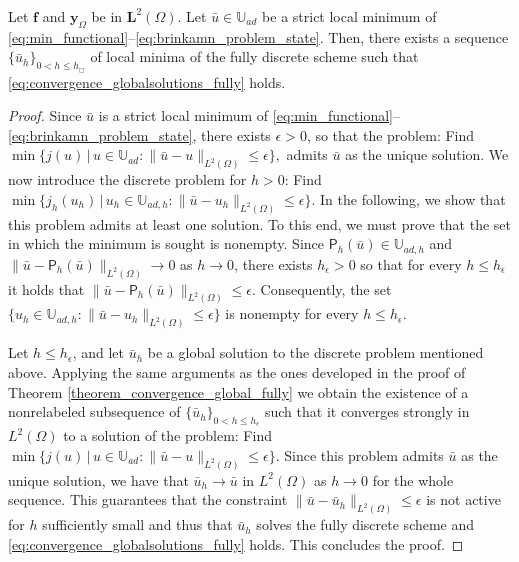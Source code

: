 \documentclass[final]{siamart0216}
\begin{document}
\begin{theorem}
Let $\mathbf{f}$ and $\mathbf{y}_{\Omega}$ be in $\mathbf{L}^2(\Omega)$. Let $\bar{u} \in \mathbb{U}_{ad}$ be a strict local minimum of \eqref{eq:min_functional}--\eqref{eq:brinkamn_problem_state}. Then, there exists a sequence $\{\bar{u}_{h}\}_{0 < h \leq h_{\Box}}$ of local minima of the fully discrete scheme such that \eqref{eq:convergence_globalsolutions_fully} holds.
\end{theorem}

\begin{proof}
Since $\bar{u}$ is a strict local minimum of \eqref{eq:min_functional}--\eqref{eq:brinkamn_problem_state}, there exists $\epsilon>0$, so that the problem: Find
$
\min \{j(u) \,| \, u \in \mathbb{U}_{ad}: \|\bar{u}-u\|_{L^2(\Omega)}\leq\epsilon\},
$
admits $\bar{u}$ as the unique solution. We now introduce the discrete problem for $h>0$: Find
$
\min \{j_h(u_{h}) \,| \, u_{h}\in \mathbb{U}_{ad,h} : \|\bar{u}-u_{h}\|_{L^2(\Omega)}\leq\epsilon\}.
$
In the following, we show that this problem admits at least one solution. To this end, we must prove that the set in which the minimum is sought is nonempty. Since $\mathsf{P}_h(\bar{u}) \in \mathbb{U}_{ad,h}$ and $\|\bar{u}-\mathsf{P}_h(\bar{u})\|_{L^2(\Omega)} \to 0$ as $h \rightarrow 0$, there exists $h_{\epsilon}>0$ so that for every $h \leq h_{\epsilon}$ it holds that $\|\bar{u}-\mathsf{P}_h(\bar{u})\|_{L^2(\Omega)}\leq\epsilon$. Consequently, the set $\{ u_{h}\in \mathbb{U}_{ad,h}: \|\bar{u}-u_{h}\|_{L^2(\Omega)}\leq\epsilon\}$ is nonempty for every $h \leq h_{\epsilon}$.

Let $h \leq h_{\epsilon}$, and let $\bar{u}_{h}$ be a global solution to the discrete problem mentioned above. Applying the same arguments as the ones developed in the proof of Theorem \ref{theorem_convergence_global_fully} we obtain the existence of a nonrelabeled subsequence of $\{\bar{u}_{h}\}_{0 < h \leq h_{\epsilon}}$ such that it converges strongly in $L^2(\Omega)$ to a solution of the problem: Find
$
\min \{j(u) \,| \, u \in \mathbb{U}_{ad}: \|\bar{u}-u\|_{L^2(\Omega)}\leq\epsilon\}.
$ 
Since this problem admits $\bar{u}$ as the unique solution, we have that $\bar{u}_{h} \to \bar{u}$ in $L^2(\Omega)$ as $h \rightarrow 0$ for the whole sequence. This guarantees that the constraint $\|\bar{u}-\bar{u}_{h}\|_{L^2(\Omega)}\leq \epsilon$ is not active for $h$ sufficiently small and thus that $\bar{u}_{h}$ solves the fully discrete scheme and \eqref{eq:convergence_globalsolutions_fully} holds. This concludes the proof.
\end{proof}
\end{document}
